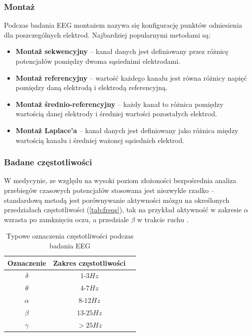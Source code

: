 \documentclass{./assets/wfis}
\begin{document}
\subsubsection{Montaż}
Podczas badania EEG montażem nazywa się konfigurację punktów odniesienia dla poszczególnych elektrod. Najbardziej popularnymi metodami są:
\begin{itemize}
    \item \textbf{Montaż sekwencyjny} – kanał danych jest definiowany przez różnicę potencjałów pomiędzy dwoma sąsiednimi elektrodami.
    \item \textbf{Montaż referencyjny} – wartość każdego kanału jest równa różnicy napięć pomiędzy daną elektrodą i elektrodą referencyjną.
    \item \textbf{Montaż średnio-referencyjny} – każdy kanał to różnica pomiędzy wartością danej elektrody i średniej wartości pozostałych elektrod. 
    \item \textbf{Montaż Laplace’a} – kanał danych jest definiowany jako różnica między wartością kanału i średniej ważonej sąsiednich elektrod.
\end{itemize}


\subsubsection{Badane częstotliwości}

W medycynie, ze względu na wysoki poziom złożoności bezpośrednia analiza przebiegów czasowych potencjałów stosowana jest niezwykle rzadko – standardową metodą jest porównywanie aktywności mózgu na określonych przedziałach częstotliwości (\autoref{tab:freqs}), tak na przykład aktywność w zakresie $\alpha$ wzrasta po zamknięciu oczu, a przedziale $\beta$ w trakcie ruchu \cite{britton_electroencephalography_2016}. 

\begin{table}[h]
    \centering
    \begin{tabular}{|c|c|c|}
        \hline
        Oznaczenie & Zakres częstotliwości \\
        \hline
        $\delta$ & $1$-$3Hz$  \\
        $\theta$ & $4$-$7Hz$ \\
        $\alpha$ & $8$-$12Hz$ \\
        $\beta$  & $13$-$25Hz$ \\
        $\gamma$ & $>25Hz$ \\
        \hline
    \end{tabular}
    \caption{Typowe oznaczenia częstotliwości podczas badania EEG}
    \label{tab:freqs}
\end{table}
\end{document}
